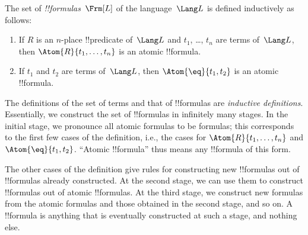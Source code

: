 \documentclass[../../../include/open-logic-section]{subfiles}
\begin{document}
\begin{defn}[Formulas]
The set of \emph{!!{formula}s}~$\Frm[L]$ of the language~$\Lang L$
is defined inductively as follows:
\begin{enumerate}


\item If $R$ is an $n$-place !!{predicate} of~$\Lang L$ and $t_1$, \dots,
  $t_n$ are terms of~$\Lang L$, then $\Atom{R}{t_1,\ldots, t_n}$ is an
  atomic !!{formula}.

\item If $t_1$ and $t_2$ are terms of~$\Lang L$, then $\Atom{\eq}{t_1, t_2}$
  is an atomic !!{formula}.








\end{enumerate}
\end{defn}

\begin{explain}
The definitions of the set of terms and that of !!{formula}s are
\emph{inductive definitions}.  Essentially, we construct the set of
!!{formula}s in infinitely many stages.  In the initial stage, we
pronounce all atomic formulas to be formulas; this corresponds to the
first few cases of the definition, i.e., the cases for
%
%
$\Atom{R}{t_1,\dots,t_n}$ and $\Atom{\eq}{t_1,t_2}$. ``Atomic
!!{formula}'' thus means any !!{formula} of this form.

The other cases of the definition give rules for constructing new
!!{formula}s out of !!{formula}s already constructed.  At the second
stage, we can use them to construct !!{formula}s out of atomic
!!{formula}s.  At the third stage, we construct new formulas from the
atomic formulas and those obtained in the second stage, and so on.  A
!!{formula} is anything that is eventually constructed at such a
stage, and nothing else.
\end{explain}
\end{document}
